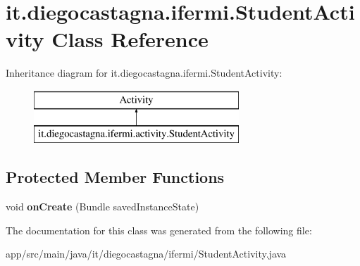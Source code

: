 \hypertarget{classit_1_1diegocastagna_1_1ifermi_1_1_student_activity}{}\section{it.\+diegocastagna.\+ifermi.\+Student\+Activity Class Reference}
\label{classit_1_1diegocastagna_1_1ifermi_1_1_student_activity}
Inheritance diagram for it.\+diegocastagna.\+ifermi.\+Student\+Activity\+:\begin{figure}[H]
\begin{center}
\leavevmode
\includegraphics[height=2.000000cm]{classit_1_1diegocastagna_1_1ifermi_1_1_student_activity}
\end{center}
\end{figure}
\subsection*{Protected Member Functions}
\begin{DoxyCompactItemize}
\item 
\mbox{\label{classit_1_1diegocastagna_1_1ifermi_1_1_student_activity_a252880a44a728e8c362bc5f07a5d49e0}} 
void {\bfseries on\+Create} (Bundle saved\+Instance\+State)
\end{DoxyCompactItemize}


The documentation for this class was generated from the following file\+:\begin{DoxyCompactItemize}
\item 
app/src/main/java/it/diegocastagna/ifermi/Student\+Activity.\+java\end{DoxyCompactItemize}
